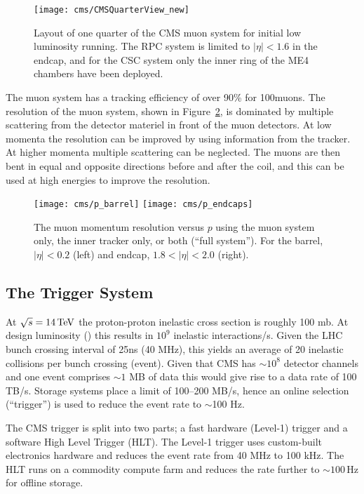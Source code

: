 \begin{figure}[htb]
\texttt{[image: cms/CMSQuarterView\_new]}
\caption{Layout of one quarter of the CMS muon system for initial low
luminosity running. The RPC system is limited to $|\eta|<1.6$ in the endcap, and
for the CSC system only the inner ring of the ME4 chambers have been deployed.~\cite{CMS_TDR_PHYS_vol1}
\label{fig:muons}}
\end{figure}

The muon system has a tracking efficiency of over 90\% for 100\GeV muons. The resolution of the muon system, shown in Figure~\ref{fig:muonresol}, is dominated by multiple scattering from the detector materiel in front of the muon detectors. At low momenta the resolution can be improved by using information from the tracker. At higher momenta multiple scattering can be neglected. The muons are then bent in equal and opposite directions before and after the coil, and this can be used at high energies to improve the resolution.

\begin{figure}[tb]
\texttt{[image: cms/p\_barrel]}
\texttt{[image: cms/p\_endcaps]}
\caption{The muon momentum resolution versus $p$ using the muon
system only, the inner tracker only, or both (``full system''). For the  barrel, $|\eta|<0.2$ (left) and endcap, $1.8<|\eta|<2.0$ (right).~\cite{CMS_TDR_PHYS_vol1}
  \label{fig:muonresol}}
\end{figure}

\subsection{The Trigger System \label{sec:trigger}}
At $\sqrt{s} = 14\,\mathrm{Te\hspace{-.08em}V}$ the proton-proton inelastic cross section is roughly 100 mb. At design luminosity (\hilumi) this results in $10^{9}$ inelastic interactions/s. Given the LHC bunch crossing interval of 25ns (40 MHz), this yields an average of 20 inelastic collisions per bunch crossing (event). Given that CMS has $\sim10^{8}$ detector channels and one event comprises $\sim 1$ MB of data this would give rise to a data rate of 100 TB/s. Storage systems place a limit of 100--200 MB/s, hence an online selection (``trigger'') is used to reduce the event rate to $\sim$100 Hz. 

The CMS trigger is split into two parts; a fast hardware (Level-1) trigger and a software High Level Trigger (HLT). The Level-1 trigger uses custom-built electronics hardware and reduces the event rate from 40 MHz to 100 kHz. The HLT runs on a commodity compute farm and reduces the rate further to $\sim 100$\,Hz for offline storage.

